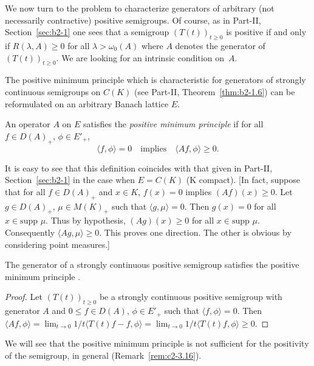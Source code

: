 We now turn to the problem to characterize generators of arbitrary (not necessarily contractive) positive semigroups.
Of course, as in Part-II, Section~\ref{sec:b2-1} 
one sees that a semigroup $(T(t))_{t \geq 0}$ is positive if and only if\/ $R(\lambda,A) \geq 0$ for all $\lambda > \omega_{0}(A)$ where $A$ denotes the generator of\/ $(T(t))_{t \geq 0}$.
We are looking for an intrinsic condition on~$A$.

The positive minimum principle which is characteristic for generators of strongly continuous semigroups on $C(K)$ (see 
Part-II, Theorem~\ref{thm:b2-1.6}) can be reformulated on an arbitrary Banach lattice $E$.
\begin{definition}\label{def:c2-1.6}
%
An operator $A$ on $E$ satisfies the \emph{positive minimum principle} if for all $f \in D(A)_{+}$, $\phi \in E'_{+}$,
\begin{equation}\label{eq:c2-P} \tag{P}
\langle f,\phi \rangle = 0 \quad \text{implies} \quad \langle Af,\phi \rangle \geq 0.
\end{equation}
\end{definition}
\begin{remark*}\label{rem:c2-1.6}
%
It is easy to see that this definition coincides with that given in Part-II, Section~\ref{sec:b2-1} 
in the case when $E = C(K)$ (K compact).
[In fact, suppose that for all $f \in D(A)_{+}$ and $x \in K$, $f(x) = 0$ implies $(Af)(x) \geq 0$.
Let $g \in D(A)_{+}$, $\mu \in M(K)_{+}$ such that $\langle g,\mu \rangle = 0$.
Then $g(x) = 0$ for all $x \in \text{supp } \mu$.
Thus by hypothesis, $(Ag)(x) \geq 0$ for all $x \in \text{supp } \mu$.
Consequently $\langle Ag,\mu \rangle \geq 0$.
This proves one direction.
The other is obvious by considering point measures.]
\end{remark*}
\begin{proposition}\label{prop:c2-1.7}
%
The generator of a strongly continuous positive semigroup satisfies the positive minimum principle .  
\end{proposition}
\begin{proof}
Let $(T(t))_{t \geq 0}$ be a strongly continuous positive semigroup with generator $A$ and $0 \leq f \in D(A)$, $\phi \in E'_{+}$ such that $\langle f,\phi \rangle = 0$.
Then $\langle Af,\phi \rangle = \lim_{t \to 0} 1/t \langle T(t)f - f, \phi \rangle = \lim_{t \to 0} 1/t \langle T(t)f, \phi \rangle \geq 0$.
\end{proof}
We will see that the positive minimum principle is not sufficient for the positivity of the semigroup, in general (Remark~\ref{rem:c2-3.16}).
